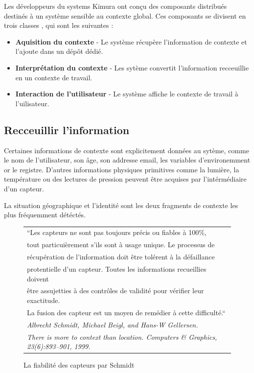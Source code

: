 Les développeurs du systems Kimura ont conçu des composants distribués destinés
à un système sensible au contexte global. Ces composants se divisent en trois
classes \cite{voida_integrating_2002}, qui sont les suivantes :

\begin{itemize}
  \item \textbf{Aquisition du contexte} - Le système récupère l'information de
	  contexte et l'ajoute dans un dépôt dédié.
  \item \textbf{Interprétation du contexte} - Les sytème convertit l'information
	  recceuillie en un contexte de travail.
  \item \textbf{Interaction de l'utilisateur} - Le système affiche le contexte
	  de travail à l'uilisateur.
\end{itemize}

\subsection{Recceuillir l'information}

Certaines informations de contexte sont explicitement données au sytème, comme
le nom de l'utilisateur, son âge, son addresse email, les variables
d'environemment or le registre. D'autres informations physiques primitives comme
la lumière, la température ou des lectures de pression peuvent être acquises par
l'intérmédiaire d'un capteur.

La situation géographique et l'identité sont les deux fragments de contexte les
plus fréquemment détéctés.

\begin{figure}[h]
  \centering
  \begin{tabular}{l}
    ``Les capteurs ne sont pas toujours précis ou fiables à 100\%, \\
    tout particuièrement s'ils sont à usage unique. Le processus de \\
    récupération de l'information doit être tolérent à la défaillance \\
    protentielle d'un capteur. Toutes les informations recueillies doivent \\
    être assujetties à des contrôles de validité pour vérifier leur exactitude.\\
    La fusion des capteur est un moyen de remédier à cette difficulté.``
    \cite{schmidt_there_1999} \\
    \em \footnotesize Albrecht Schmidt, Michael Beigl, and Hans-W Gellersen. \\
    \em \footnotesize There is more to context than location. Computers \&
    Graphics, 23(6):893–901, 1999.
  \end{tabular}
  \caption{La fiabilité des capteurs par Schmidt}
  \label{fig:quote}
\end{figure}

